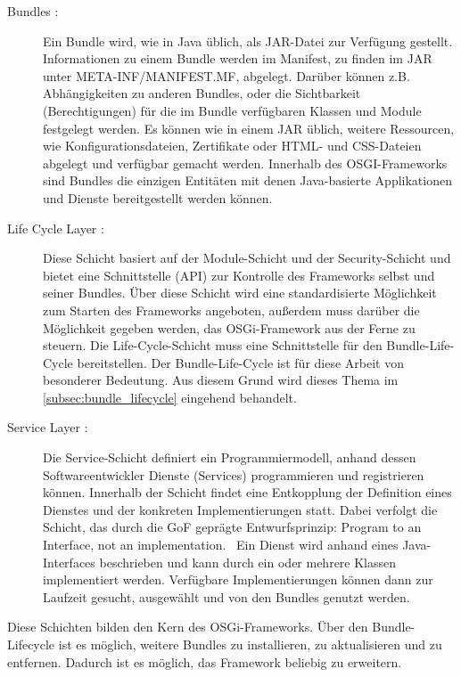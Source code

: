 \begin{description}
 \item[Bundles {\normalfont \cite[S. 31-36]{osgi_r6}}:]
 Ein Bundle wird, wie in Java üblich, als \ac{JAR}-Datei zur Verfügung gestellt.
 Informationen zu einem Bundle werden im Manifest, zu finden im \ac{JAR} unter META-INF/MANIFEST.MF, abgelegt. Darüber können z.B.
 Abhängigkeiten zu anderen Bundles, oder die Sichtbarkeit (Berechtigungen) für die im Bundle verfügbaren Klassen und Module festgelegt werden.
 Es können wie in einem \ac{JAR} üblich, weitere Ressourcen, wie Konfigurationsdateien, Zertifikate oder HTML- und CSS-Dateien abgelegt und verfügbar gemacht werden.
 Innerhalb des OSGI-Frameworks sind Bundles die einzigen Entitäten mit denen Java-basierte Applikationen und Dienste bereitgestellt werden können.
 
 \item [Life Cycle Layer {\normalfont \cite[S. 93-125]{osgi_r6}}:]
 Diese Schicht basiert auf der Module-Schicht und der Security-Schicht und bietet eine Schnittstelle (\ac{API}) zur Kontrolle des Frameworks selbst und seiner Bundles.
 Über diese Schicht wird eine standardisierte Möglichkeit zum Starten des Frameworks angeboten, außerdem muss darüber die Möglichkeit gegeben werden, das OSGi-Framework 
 aus der Ferne zu steuern. Die Life-Cycle-Schicht muss eine Schnittstelle für den Bundle-Life-Cycle bereitstellen. Der Bundle-Life-Cycle ist für diese Arbeit von besonderer Bedeutung.
 Aus diesem Grund wird dieses Thema im \autoref{subsec:bundle_lifecycle} eingehend behandelt.
 
 \item [Service Layer {\normalfont \cite[S. 127-143]{osgi_r6}}:]
 Die Service-Schicht definiert ein Programmiermodell, anhand dessen Softwareentwickler Dienste (Services) programmieren und 
 registrieren können.
 Innerhalb der Schicht findet eine Entkopplung der Definition eines Dienstes und der konkreten Implementierungen statt.
 Dabei verfolgt die Schicht, das durch die \ac{GoF} geprägte Entwurfsprinzip:
 \glqq Program to an Interface, not an implementation.\grqq\ \cite{gof} 
 Ein Dienst wird anhand eines Java-Interfaces beschrieben und kann durch ein oder mehrere Klassen implementiert werden.
 Verfügbare Implementierungen können dann zur Laufzeit gesucht, ausgewählt und von den Bundles genutzt werden. 
\end{description}


Diese Schichten bilden den Kern des \ac{OSGi}-Frameworks. Über den Bundle-Lifecycle ist es möglich, weitere Bundles zu installieren, zu aktualisieren und zu entfernen.
Dadurch ist es möglich, das Framework beliebig zu erweitern.

